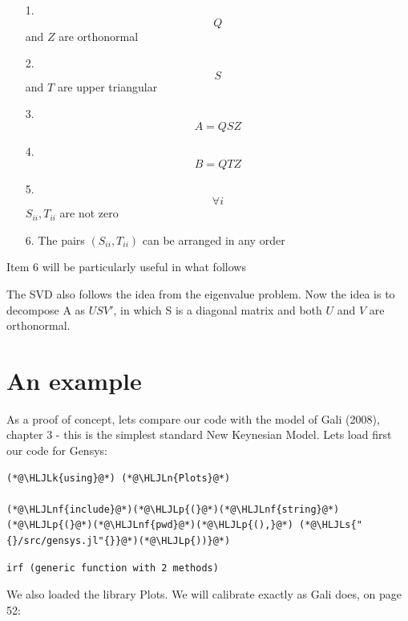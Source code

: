 \documentclass[12pt,a4paper]{article}
\newcommand{\HLJLk}[1]{\textcolor[RGB]{148,91,176}{\textbf{#1}}}
\newcommand{\HLJLn}[1]{#1}
\newcommand{\HLJLnf}[1]{\textcolor[RGB]{66,102,213}{#1}}
\newcommand{\HLJLs}[1]{\textcolor[RGB]{201,61,57}{#1}}
\newcommand{\HLJLp}[1]{#1}
\begin{document}
\begin{itemize}
\item[1. ] \[
Q
\]
and $Z$ are orthonormal


\item[2. ] \[
S
\]
and $T$ are upper triangular


\item[3. ] \[
A = QSZ
\]

\item[4. ] \[
B = QTZ
\]

\item[5. ] \[
\forall i
\]
$S_{ii}, T_{ii}$ are not zero


\item[6. ] The pairs $(S_{ii}, T_{ii})$ can be arranged in any order

\end{itemize}
Item 6 will be particularly useful in what follows

The SVD also follows the idea from the eigenvalue problem. Now the idea is to decompose A as $USV'$, in which S is a diagonal matrix and both $U$ and $V$ are orthonormal.

\section{An example}
As a proof of concept, lets compare our code with the model of Gali (2008), chapter 3 - this is the simplest standard New Keynesian Model. Lets load first our code for Gensys:


\begin{lstlisting}
(*@\HLJLk{using}@*) (*@\HLJLn{Plots}@*)

(*@\HLJLnf{include}@*)(*@\HLJLp{(}@*)(*@\HLJLnf{string}@*)(*@\HLJLp{(}@*)(*@\HLJLnf{pwd}@*)(*@\HLJLp{(),}@*) (*@\HLJLs{"{}/src/gensys.jl"{}}@*)(*@\HLJLp{))}@*)
\end{lstlisting}

\begin{lstlisting}
irf (generic function with 2 methods)
\end{lstlisting}


We also loaded the library Plots. We will calibrate exactly as Gali does, on page 52:
\end{document}
